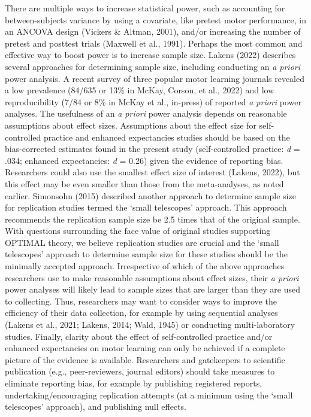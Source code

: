 \documentclass[
  man, donotrepeattitle,mask,floatsintext]{apa7}
\begin{document}
There are multiple ways to increase statistical power, such as accounting for between-subjects variance by using a covariate, like pretest motor performance, in an ANCOVA design (Vickers \& Altman, 2001), and/or increasing the number of pretest and posttest trials (Maxwell et al., 1991). Perhaps the most common and effective way to boost power is to increase sample size. Lakens (2022) describes several approaches for determining sample size, including conducting an \emph{a priori} power analysis. A recent survey of three popular motor learning journals revealed a low prevalence (84/635 or 13\% in McKay, Corson, et al., 2022) and low reproducibility (7/84 or 8\% in McKay et al., in-press) of reported \emph{a priori} power analyses. The usefulness of an \emph{a priori} power analysis depends on reasonable assumptions about effect sizes. Assumptions about the effect size for self-controlled practice and enhanced expectancies studies should be based on the bias-corrected estimates found in the present study (self-controlled practice: \emph{d} = .034; enhanced expectancies: \emph{d} = 0.26) given the evidence of reporting bias. Researchers could also use the smallest effect size of interest (Lakens, 2022), but this effect may be even smaller than those from the meta-analyses, as noted earlier. Simonsohn (2015) described another approach to determine sample size for replication studies termed the `small telescopes' approach. This approach recommends the replication sample size be 2.5 times that of the original sample. With questions surrounding the face value of original studies supporting OPTIMAL theory, we believe replication studies are crucial and the `small telescopes' approach to determine sample size for these studies should be the minimally accepted approach. Irrespective of which of the above approaches researchers use to make reasonable assumptions about effect sizes, their \emph{a priori} power analyses will likely lead to sample sizes that are larger than they are used to collecting. Thus, researchers may want to consider ways to improve the efficiency of their data collection, for example by using sequential analyses (Lakens et al., 2021; Lakens, 2014; Wald, 1945) or conducting multi-laboratory studies. Finally, clarity about the effect of self-controlled practice and/or enhanced expectancies on motor learning can only be achieved if a complete picture of the evidence is available. Researchers and gatekeepers to scientific publication (e.g., peer-reviewers, journal editors) should take measures to eliminate reporting bias, for example by publishing registered reports, undertaking/encouraging replication attempts (at a minimum using the `small telescopes' approach), and publishing null effects.
\end{document}
